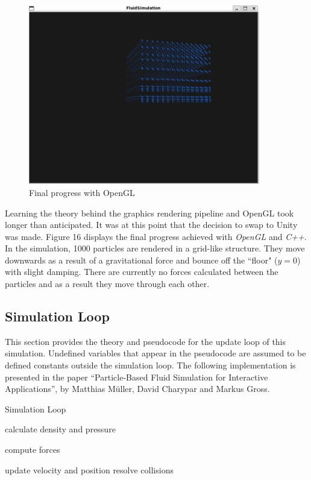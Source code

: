 \documentclass[12pt]{article}
\begin{document}
    \begin{figure}[H]
        \begin{center}
            \includegraphics[width=0.9\textwidth]{openGLProg.png}
            \caption{Final progress with OpenGL}
        \end{center}
    \end{figure}
    
    Learning the theory behind the graphics rendering pipeline and OpenGL took longer than anticipated. It was at this point that the decision to swap to Unity was made. Figure 16 displays the final progress achieved with \textit{OpenGL} and \textit{C++}. In the simulation, 1000 particles are rendered in a grid-like structure. They move downwards as a result of a gravitational force and bounce off the ``floor" ($y = 0$) with slight damping. There are currently no forces calculated between the particles and as a result they move through each other.

    \subsection{Simulation Loop}

    This section provides the theory and pseudocode for the update loop of this simulation. Undefined variables that appear in the pseudocode are assumed to be defined constants outside the simulation loop. The following implementation is presented in the paper ``Particle-Based Fluid Simulation for Interactive Applications'', by Matthias Müller, David Charypar and Markus Gross\cite{sca}.

    \begin{algorithm}
        \caption{Simulation Loop}

        \begin{algorithmic}[1]
                \State calculate density and pressure
            \EndFor

                \State compute forces
            \EndFor

                \State update velocity and position
                \State resolve collisions
            \EndFor
        \end{algorithmic}

    \end{algorithm}
\end{document}
